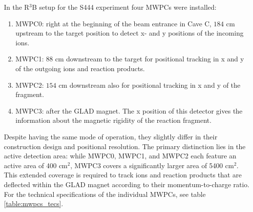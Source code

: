 In the R$^3$B setup for the S444 experiment four MWPCs were installed:\newline
\begin{enumerate}
\item MWPC0: right at the beginning of the beam entrance in Cave C, $184$ cm upstream to the target position to detect x- and y positions of the incoming ions.
\item MWPC1: $88$ cm downstream to the target for positional tracking in x and y of the outgoing ions and reaction products.
\item MWPC2: $154$ cm downstream also for positional tracking in x and y of the fragment.
\item MWPC3: after the GLAD magnet. The x position of this detector gives the information about the magnetic rigidity of the reaction fragment.  %
\end{enumerate}
Despite having the same mode of operation, they slightly differ in their construction design and positional resolution. The primary distinction lies in the active detection area: while MWPC0, MWPC1, and MWPC2 each feature an active area of 400 cm$^{2}$, MWPC3 covers a significantly larger area of 5400 cm$^{2}$. This extended coverage is required to track ions and reaction products that are deflected within the GLAD magnet according to their momentum-to-charge ratio. For the technical specifications of the individual MWPCs, see table \ref{table:mwpcs_tecs}.
